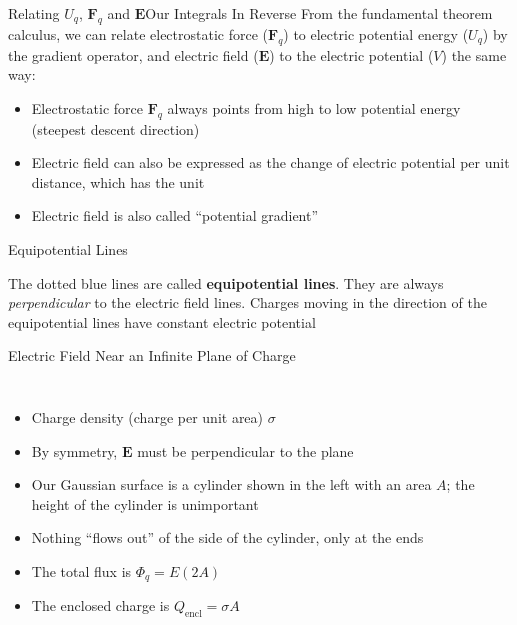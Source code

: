 \documentclass[12pt,aspectratio=169]{beamer}
\begin{document}
\begin{frame}{Relating $U_q$, $\bm{F}_q$ and $\bm{E}$}{Our Integrals In Reverse}
  From the fundamental theorem calculus, we can relate electrostatic force
  ($\bm{F}_q$) to electric potential energy ($U_q$) by the gradient operator,
  and electric field ($\bm{E}$) to the electric potential ($V$) the same way:

  \begin{itemize}  
  \item Electrostatic force $\bm{F}_q$ always points from high to
    low potential energy (steepest descent direction)
  \item Electric field can also be expressed as the change of electric
    potential per unit distance, which has the unit
    
  \item Electric field is also called ``potential gradient''
  \end{itemize}
\end{frame}



\begin{frame}{Equipotential Lines}
  \begin{center}
  \end{center}
  The dotted blue lines are called \textbf{equipotential lines}. They are
  always \emph{perpendicular} to the electric field lines. Charges moving in
  the direction of the equipotential lines have constant electric potential
\end{frame}



\begin{frame}{Electric Field Near an Infinite Plane of Charge}
  \begin{columns}

    \begin{itemize}
    \item Charge density (charge per unit area) $\sigma$
    \item By symmetry, $\bm{E}$ must be perpendicular to the plane
    \item Our Gaussian surface is a cylinder shown in the left with an area
      $A$; the height of the cylinder is unimportant
    \item Nothing ``flows out'' of the side of the cylinder, only at the ends
    \item The total flux is $\Phi_q=E(2A)$
    \item The enclosed charge is $Q_\text{encl}=\sigma A$
    \end{itemize}
  \end{columns}
\end{frame}
\end{document}
